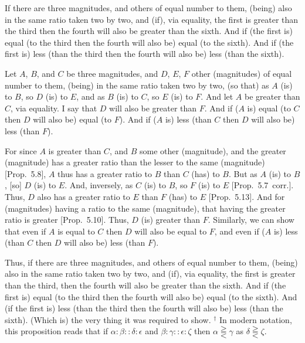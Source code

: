 If there are three magnitudes, and others of equal
 number to them,   (being) also in the same ratio taken two by two, and (if),
via equality,  the first is greater
than the third then the fourth will also be greater than the sixth. And
 if (the first is) equal (to the third then the fourth will also be) equal
(to the sixth). 
And if (the first is) less (than the third then the fourth will also be) less (than
the sixth).

\epsfysize=0.7in
\centerline{}

Let $A$, $B$, and $C$ be three magnitudes, and $D$, $E$, $F$ other (magnitudes) of equal
number to them, (being) in the same ratio taken two by two, (so that)
as $A$ (is) to $B$, so $D$ (is) to $E$, and as $B$ (is) to $C$, so $E$ (is) to $F$. And let $A$
be greater than $C$, via equality. I say that $D$ will also be greater
than $F$. And if ($A$ is) equal (to $C$ then $D$ will also be) equal (to $F$). And
if ($A$ is) less (than $C$ then $D$ will also be) less (than $F$).

For since $A$ is greater than $C$, and $B$ some other (magnitude), and
the greater (magnitude) has a greater ratio than the lesser to the same (magnitude) [Prop.~5.8], $A$ thus has
a greater ratio to $B$ than $C$ (has) to $B$. But as $A$ (is) to $B$, [so] $D$ (is)
to $E$. And, inversely, as $C$ (is) to $B$,  so  $F$ (is) to $E$ [Prop.~5.7~corr.]. Thus, $D$ also has a greater
ratio to $E$ than $F$ (has) to $E$ [Prop.~5.13]. And for (magnitudes) having a ratio to the
same (magnitude), that having the greater ratio is greater [Prop.~5.10]. Thus, $D$ (is) greater than $F$.
Similarly, we can show that even if $A$ is equal to $C$ then $D$ will also
be equal to $F$, and even if ($A$ is) less (than $C$ then $D$ will also
be) less (than $F$).

Thus, if there are three magnitudes, and others of equal
number to them,   (being) also in the same ratio taken two by two, and (if),
via equality, the first is greater
than the third, then the fourth will also be greater than the sixth. And
 if (the first is) equal (to the third then the fourth will also be) equal
(to the sixth). And (if the first is) less (than the third then the fourth will also be) less (than
the sixth). (Which is) the very thing it was required to show.
{\footnotesize \noindent$^\dag$ In modern notation, this proposition
reads that if $\alpha:\beta::\delta:\epsilon$ and $\beta:\gamma::\epsilon:\zeta$ then $\alpha\gtreqqless\gamma$ as $\delta\gtreqqless\zeta$.}

